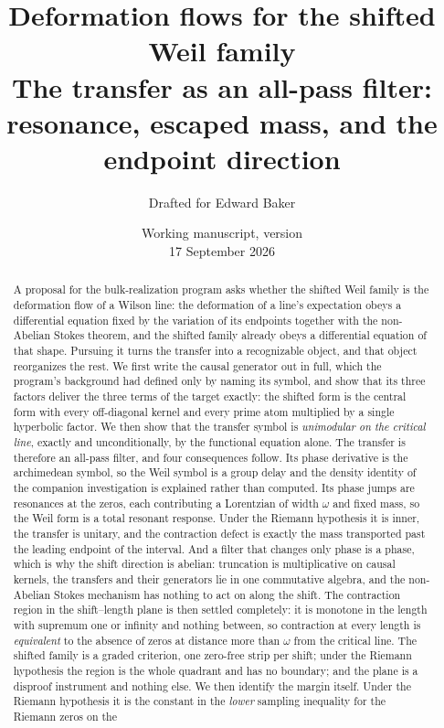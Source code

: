 \documentclass[11pt]{article}
\title{Deformation flows for the shifted Weil family\\[5pt]
\large The transfer as an all-pass filter: resonance, escaped mass,
and the endpoint direction}
\author{Drafted for Edward Baker}
\date{Working manuscript, version \draftversion\\17 September 2026}
\numberwithin{equation}{section}
\theoremstyle{definition}
\theoremstyle{remark}
\begin{document}
\maketitle
\begin{abstract}
A proposal for the bulk-realization program asks whether the shifted Weil family
is the deformation flow of a Wilson line: the deformation of a line's expectation
obeys a differential equation fixed by the variation of its endpoints together
with the non-Abelian Stokes theorem, and the shifted family already obeys a
differential equation of that shape. Pursuing it turns the transfer into a
recognizable object, and that object reorganizes the rest. We first write the
causal generator out in full, which the program's background had defined only by
naming its symbol, and show that its three factors deliver the three terms of the
target exactly: the shifted form is the central form with every off-diagonal
kernel and every prime atom multiplied by a single hyperbolic factor. We then
show that the transfer symbol is \emph{unimodular on the critical line}, exactly
and unconditionally, by the functional equation alone. The transfer is therefore
an all-pass filter, and four consequences follow. Its phase derivative is the
archimedean symbol, so the Weil symbol is a group delay and the density identity
of the companion investigation is explained rather than computed. Its phase jumps
are resonances at the zeros, each contributing a Lorentzian of width $\omega$ and
fixed mass, so the Weil form is a total resonant response. Under the Riemann
hypothesis it is inner, the transfer is unitary, and the contraction defect is
exactly the mass transported past the leading endpoint of the interval. And a
filter that changes only phase is a phase, which is why the shift direction is
abelian: truncation is multiplicative on causal kernels, the transfers and their
generators lie in one commutative algebra, and the non-Abelian Stokes mechanism
has nothing to act on along the shift. The contraction region in the
shift--length plane is then settled completely: it is monotone in the length with
supremum one or infinity and nothing between, so contraction at every length is
\emph{equivalent} to the absence of zeros at distance more than $\omega$ from the
critical line. The shifted family is a graded criterion, one zero-free strip per
shift; under the Riemann hypothesis the region is the whole quadrant and has no
boundary; and the plane is a disproof instrument and nothing else.
We then identify the margin itself. Under the Riemann hypothesis it is the
constant in the \emph{lower} sampling inequality for the Riemann zeros on the

\end{abstract}
\end{document}
